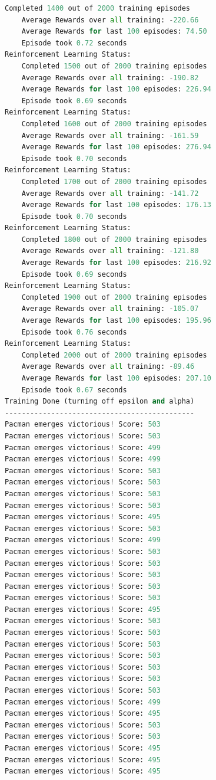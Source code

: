 \documentclass{report}
\begin{document}
\begin{lstlisting}[language=Python, caption=Autograder]
	Completed 1400 out of 2000 training episodes
	Average Rewards over all training: -220.66
	Average Rewards for last 100 episodes: 74.50
	Episode took 0.72 seconds
Reinforcement Learning Status:
	Completed 1500 out of 2000 training episodes
	Average Rewards over all training: -190.82
	Average Rewards for last 100 episodes: 226.94
	Episode took 0.69 seconds
Reinforcement Learning Status:
	Completed 1600 out of 2000 training episodes
	Average Rewards over all training: -161.59
	Average Rewards for last 100 episodes: 276.94
	Episode took 0.70 seconds
Reinforcement Learning Status:
	Completed 1700 out of 2000 training episodes
	Average Rewards over all training: -141.72
	Average Rewards for last 100 episodes: 176.13
	Episode took 0.70 seconds
Reinforcement Learning Status:
	Completed 1800 out of 2000 training episodes
	Average Rewards over all training: -121.80
	Average Rewards for last 100 episodes: 216.92
	Episode took 0.69 seconds
Reinforcement Learning Status:
	Completed 1900 out of 2000 training episodes
	Average Rewards over all training: -105.07
	Average Rewards for last 100 episodes: 195.96
	Episode took 0.76 seconds
Reinforcement Learning Status:
	Completed 2000 out of 2000 training episodes
	Average Rewards over all training: -89.46
	Average Rewards for last 100 episodes: 207.10
	Episode took 0.67 seconds
Training Done (turning off epsilon and alpha)
---------------------------------------------
Pacman emerges victorious! Score: 503
Pacman emerges victorious! Score: 503
Pacman emerges victorious! Score: 499
Pacman emerges victorious! Score: 499
Pacman emerges victorious! Score: 503
Pacman emerges victorious! Score: 503
Pacman emerges victorious! Score: 503
Pacman emerges victorious! Score: 503
Pacman emerges victorious! Score: 495
Pacman emerges victorious! Score: 503
Pacman emerges victorious! Score: 499
Pacman emerges victorious! Score: 503
Pacman emerges victorious! Score: 503
Pacman emerges victorious! Score: 503
Pacman emerges victorious! Score: 503
Pacman emerges victorious! Score: 503
Pacman emerges victorious! Score: 495
Pacman emerges victorious! Score: 503
Pacman emerges victorious! Score: 503
Pacman emerges victorious! Score: 503
Pacman emerges victorious! Score: 503
Pacman emerges victorious! Score: 503
Pacman emerges victorious! Score: 503
Pacman emerges victorious! Score: 503
Pacman emerges victorious! Score: 499
Pacman emerges victorious! Score: 495
Pacman emerges victorious! Score: 503
Pacman emerges victorious! Score: 503
Pacman emerges victorious! Score: 495
Pacman emerges victorious! Score: 495
Pacman emerges victorious! Score: 495

\end{lstlisting}
\end{document}
